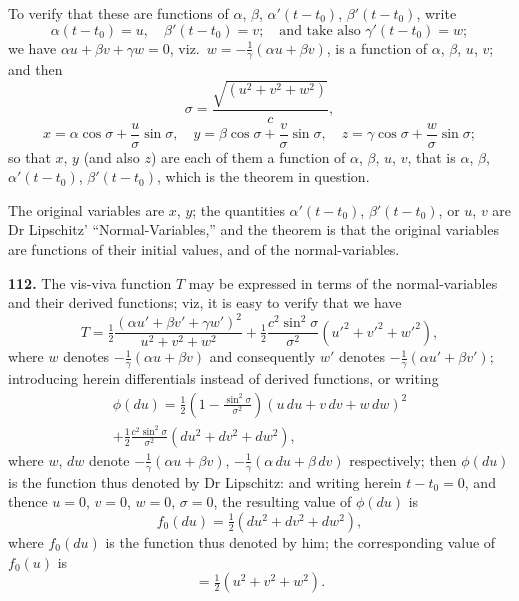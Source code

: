 \documentclass[11pt,a4paper]{article}
\theoremstyle{plain}
\begin{document}
To verify that these are functions of $\alpha$, $\beta$, $\alpha'(t - t_0)$, $\beta'(t - t_0)$, write
\[
\alpha(t - t_0) = u, \quad \beta'(t - t_0) = v; \quad \text{and take also } \gamma'(t - t_0) = w;
\]
we have $\alpha u + \beta v + \gamma w = 0$, viz.\ $w = -\frac{1}{\gamma}(\alpha u + \beta v)$, is a function of $\alpha$, $\beta$, $u$, $v$; and then
\[
\sigma = \frac{\sqrt{(u^2 + v^2 + w^2)}}{c},
\]
\[
x = \alpha\cos\sigma + \frac{u}{\sigma}\sin\sigma, \quad
y = \beta\cos\sigma + \frac{v}{\sigma}\sin\sigma, \quad
z = \gamma\cos\sigma + \frac{w}{\sigma}\sin\sigma;
\]
so that $x$, $y$ (and also $z$) are each of them a function of $\alpha$, $\beta$, $u$, $v$, that is $\alpha$, $\beta$, $\alpha'(t - t_0)$, $\beta'(t - t_0)$, which is the theorem in question.

The original variables are $x$, $y$; the quantities $\alpha'(t - t_0)$, $\beta'(t - t_0)$, or $u$, $v$ are Dr Lipschitz' ``Normal-Variables,'' and the theorem is that the original variables are functions of their initial values, and of the normal-variables.


\noindent\textbf{112.} The vis-viva function $T$ may be expressed in terms of the normal-variables and their derived functions; viz, it is easy to verify that we have
\[
T = \tfrac{1}{2}\frac{(\alpha u' + \beta v' + \gamma w')^2}{u^2 + v^2 + w^2} + \tfrac{1}{2}\frac{c^2\sin^2\sigma}{\sigma^2}(u'^2 + v'^2 + w'^2),
\]
where $w$ denotes $-\frac{1}{\gamma}(\alpha u + \beta v)$ and consequently $w'$ denotes $-\frac{1}{\gamma}(\alpha u' + \beta v')$; introducing herein differentials instead of derived functions, or writing
\begin{multline*}
\phi(du) = \tfrac{1}{2}\left(1 - \frac{\sin^2\sigma}{\sigma^2}\right)(u\,du + v\,dv + w\,dw)^2 \\
+ \tfrac{1}{2}\frac{c^2\sin^2\sigma}{\sigma^2}(du^2 + dv^2 + dw^2),
\end{multline*}
where $w$, $dw$ denote $-\frac{1}{\gamma}(\alpha u + \beta v)$, $-\frac{1}{\gamma}(\alpha\,du + \beta\,dv)$ respectively; then $\phi(du)$ is the function thus denoted by Dr Lipschitz: and writing herein $t - t_0 = 0$, and thence $u = 0$, $v = 0$, $w = 0$, $\sigma = 0$, the resulting value of $\phi(du)$ is
\[
f_0(du) = \tfrac{1}{2}(du^2 + dv^2 + dw^2),
\]
where $f_0(du)$ is the function thus denoted by him; the corresponding value of $f_0(u)$ is
\[
= \tfrac{1}{2}(u^2 + v^2 + w^2).
\]
\end{document}
